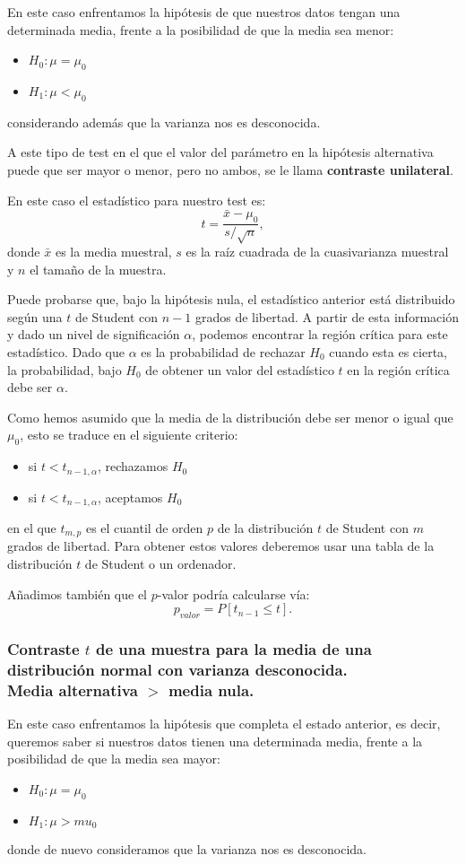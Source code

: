 \documentclass[a4paper,12pt]{article}
\begin{document}
 En este caso enfrentamos la hipótesis de que nuestros datos tengan una determinada media, frente a la posibilidad  de que la media sea menor:
 \begin{itemize}
 	\item $H_0:\mu = \mu_0$
 	\item $H_1: \mu < \mu_0$
 \end{itemize}
considerando además que la varianza nos es desconocida.

A este tipo de test  en el que el valor del parámetro en la hipótesis alternativa puede que ser mayor o menor, pero no ambos, se le llama \textbf{contraste unilateral}.
 
 En este caso el estadístico para nuestro test es: 
 $$t=\frac{\bar{x}-\mu_0}{s/\sqrt{n}},$$
 donde $\bar{x}$ es la media muestral, $s$ es la raíz cuadrada de la cuasivarianza muestral y $n$ el tamaño de la muestra.

 Puede probarse que, bajo la hipótesis nula, el estadístico anterior está distribuido según una $t$ de Student con $n - 1$ grados de libertad.
 A partir de esta información y dado un nivel de significación $\alpha$, podemos encontrar la región crítica para este estadístico.
 Dado que $\alpha$ es la probabilidad de rechazar $H_0$ cuando esta es cierta, la probabilidad, bajo $H_0$ de obtener un valor del estadístico $t$ en la región crítica debe ser $\alpha$.

 Como hemos asumido que la media de la distribución debe ser menor o igual que $\mu_0$, esto se traduce en el siguiente criterio:
 \begin{itemize}
 	\item si $t<t_{n-1,\alpha}$, rechazamos $H_0$
 	\item si $t<t_{n-1,\alpha}$, aceptamos $H_0$
 \end{itemize}
 en el que $t_{m, p}$ es el cuantil de orden $p$ de la distribución $t$ de Student con $m$ grados de libertad. Para obtener estos valores deberemos usar una tabla de la distribución $t$ de Student o un ordenador.

 Añadimos también que el $p$-valor podría calcularse vía:
 $$p_{valor}=P[t_{n-1}\leq t].$$

 
 \subsubsection{Contraste $t$ de una muestra para la media de una distribución normal con varianza desconocida. \\ Media alternativa $>$ media nula.}
 En este caso enfrentamos la hipótesis que completa el estado anterior, es decir, queremos saber si nuestros datos tienen una determinada media, frente a la posibilidad  de que la media sea mayor: 
 \begin{itemize}
 	\item $H_0:\mu=\mu_0$
 	\item $H_1: \mu>mu_0$
 \end{itemize}
 donde de nuevo consideramos que la varianza nos es desconocida.
 
\end{document}
